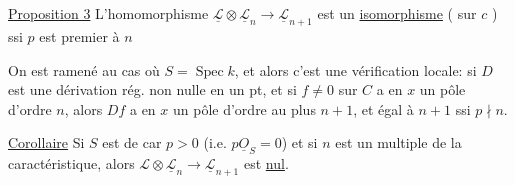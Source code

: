 \uline{Proposition 3}  L'homomorphisme $\underline{\mathcal L}\otimes\underline{\mathcal L}_n\longrightarrow\underline{\mathcal L}_{n+1}$ est un \uline{isomorphisme} (  sur $c$ ) ssi $p$ est premier à $n$

On est ramené au cas où $S=\operatorname{Spec} k$, et alors c'est une vérification locale: si $D$ est une  dérivation rég. non nulle en un pt, et si $f\ne0$ sur $C$ a en $x$ un pôle d'ordre $n$,
 alors  $Df$ a en $x$ un pôle d'ordre au plus $n+1$, et égal à $n+1$ ssi $p\nmid n$.



\uline{Corollaire} Si $S$ est de car $p>0$ (i.e. $p\underline O_S=0$) et si $n$ est un multiple de la caractéristique, alors $\mathcal L\otimes\underline{\mathcal L}_n\longrightarrow\underline{\mathcal L}_{n+1}$ est \uline{nul}.

